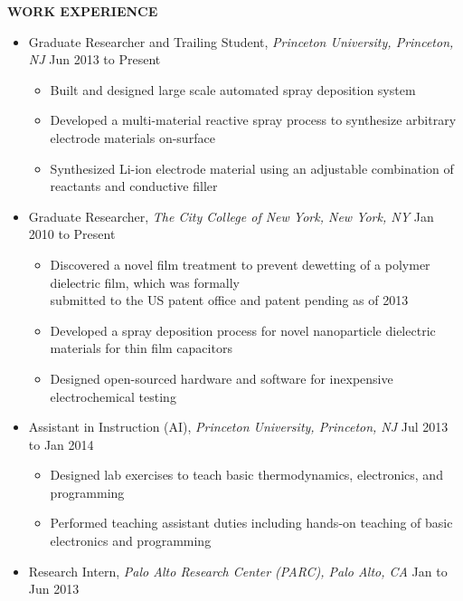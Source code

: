 \documentclass[9pt,letterpaper]{article}
\begin{document}
{\singlespacing
\noindent \textbf{WORK EXPERIENCE}

{\small
\begin{itemize}
  \item \noindent Graduate Researcher and Trailing Student, \emph{Princeton University, Princeton, NJ} \hfill {\scriptsize Jun 2013 to Present}
    {\footnotesize\begin{itemize} 
        \item Built and designed large scale automated spray deposition system
        \item Developed a multi-material reactive spray process to synthesize arbitrary electrode materials on-surface
        \item Synthesized Li-ion electrode material using an adjustable combination of reactants and conductive filler
    \end{itemize}}
  \item \noindent Graduate Researcher, \emph{The City College of New York, New York, NY} \hfill {\scriptsize Jan 2010 to Present}
    {\footnotesize\begin{itemize} 
        \item Discovered a novel film treatment to prevent dewetting of a polymer dielectric film, which was formally \\ submitted to the US patent office and patent pending as of 2013
        \item Developed a spray deposition process for novel nanoparticle dielectric materials for thin film capacitors
        \item Designed open-sourced hardware and software for inexpensive electrochemical testing 
    \end{itemize}}
  \item \noindent Assistant in Instruction (AI), \emph{Princeton University, Princeton, NJ} \hfill {\scriptsize Jul 2013 to Jan 2014} 
    {\footnotesize\begin{itemize} 
        \item Designed lab exercises to teach basic thermodynamics, electronics, and programming
        \item Performed teaching assistant duties including hands-on teaching of basic electronics and programming  
    \end{itemize}}
  \item \noindent Research Intern, \emph{Palo Alto Research Center (PARC), Palo Alto, CA} \hfill {\scriptsize Jan to Jun 2013}
    {\footnotesize\begin{itemize} 

\end{itemize}}
\end{itemize}}}
\end{document}
